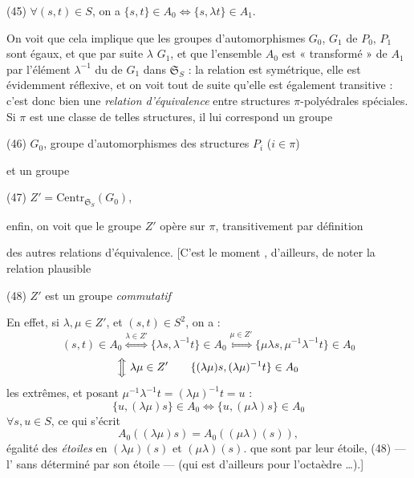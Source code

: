 \documentclass[11pt,a4paper]{article}
\begin{document}
(45) $\forall (s,t)\in S$, on a $\{s,t\}\in A_0 \Longleftrightarrow \{s,\lambda t\}\in A_1$.

On voit que cela implique que les groupes d'automorphismes $G_0$, $G_1$ de $P_0$, $P_1$
sont égaux, et que par suite $\lambda$   $G_1$,
et que l'ensemble $A_0$ est « transformé » de $A_1$ par l'élément $\lambda^{-1}$ du
 de $G_1$ dans $\mathfrak{S}_S$ : la relation  est
\ill{} symétrique, elle est évidemment réflexive, et on voit tout de suite qu'elle
est également transitive :  c'est donc bien une \emph{relation d'équivalence} entre
structures $\pi$-polyédrales spéciales. Si \struck{\ill{}} $\pi$ est une classe de
telles structures, il lui correspond un groupe

(46) $G_0$, groupe d'automorphismes des structures  $P_i$
\struck{$\in$ \ill{}} ($i\in\pi$)

et un groupe

(47) $Z' = \mathrm{Centr}_{\mathfrak{S}_S}(G_0)$,

enfin, on voit que le groupe $Z'$ opère sur $\pi$, transitivement par définition

des autres relations d'équivalence. [C'est le moment , d'ailleurs, de
noter la relation plausible

(48) $Z'$ est un groupe \emph{commutatif}

En effet, si $\lambda,\mu\in Z'$, et $(s,t)\in S^2$, on a :
\[
(s,t)\in A_0 \overset{\lambda\in Z'}{\Longleftrightarrow} \{\lambda s,\lambda^{-1}t\}\in A_0
\overset{\mu\in Z'}{\Longleftrightarrow} \{\mu\lambda s,\mu^{-1}\lambda^{-1}t\}\in A_0
\]
\[
\Big\Updownarrow\ \lambda\mu\in Z' \qquad
\{(\lambda\mu)s,(\lambda\mu)^{-1}t\}\in A_0
\]
 \ill{} les extrêmes, et posant
$\mu^{-1}\lambda^{-1}t=(\lambda\mu)^{-1}t=u$ :
\[
\{u,(\lambda\mu)s\}\in A_0 \Longleftrightarrow \{u,(\mu\lambda)s\}\in A_0
\]
$\forall s,u\in S$, ce qui s'écrit
\[
A_0((\lambda\mu)s) = A_0((\mu\lambda)(s)),
\]
\struck{\ill{}} égalité des \emph{étoiles} en $(\lambda\mu)(s)$ et $(\mu\lambda)(s)$.
 \ill{} que  sont  par leur
étoile, \ill{} (48) —  \ill{}  \struck{\ill{}}
l'  sans \ill{} déterminé par son étoile — (qui est
d'ailleurs  pour l'octaèdre …).]
\end{document}
